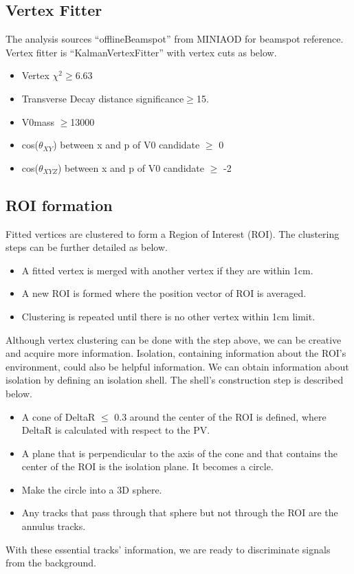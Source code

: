 \subsection{Vertex Fitter}\label{sec:ROI_V0Fitter}

The analysis sources ``offlineBeamspot'' from MINIAOD for beamspot reference.
Vertex fitter is ``KalmanVertexFitter'' with vertex cuts as below.
\begin{itemize}
  \item Vertex $\chi^{2}\geq$6.63 
  \item Transverse Decay distance significance$\geq$15.
  \item V0mass $\geq$13000\GeV
  \item cos($\theta_{XY}$) between x and p of V0 candidate $\geq$ 0
  \item cos($\theta_{XYZ}$) between x and p of V0 candidate $\geq$ -2
\end{itemize}

\subsection{ROI formation}\label{sec:ROI_ROIformation}
Fitted vertices are clustered to form a Region of Interest (ROI).
The clustering steps can be further detailed as below.
\begin{itemize}
  \item A fitted vertex is merged with another vertex if they are within 1cm. 
  \item A new ROI is formed where the position vector of ROI is averaged.
  \item Clustering is repeated until there is no other vertex within 1cm limit.
\end{itemize}
Although vertex clustering can be done with the step above, we can be creative and acquire more information.
Isolation, containing information about the ROI's environment, could also be helpful information.
We can obtain information about isolation by defining an isolation shell.
The shell's construction step is described below.
\begin{itemize}
  \item A cone of DeltaR $\leq$ 0.3 around the center of the ROI is defined, where DeltaR is calculated with respect to the PV.
  \item A plane that is perpendicular to the axis of the cone and that contains the center of the ROI is the isolation plane. It becomes a circle. 
  \item Make the circle into a 3D sphere.
  \item Any tracks that pass through that sphere but not through the ROI are the annulus tracks.
\end{itemize}
With these essential tracks' information, we are ready to discriminate signals from the background.

